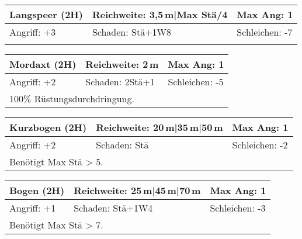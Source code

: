 \documentclass[../../Heldenanleitung2]{subfiles}
\begin{document}
\newline \newline\newline
\begin{tabular}{|p{}|p{}|p{}|}
\hline
\textbf{Langspeer (2H)} & Reichweite: 3,5\,m|Max Stä/4 & Max Ang: 1\\
\hline
Angriff: +3 & Schaden: Stä+1W8 & Schleichen: -7\\
\hline
\multicolumn{3}{|p{0.99\textwidth}|}{} \\
\hline
\end{tabular}
\newline \newline\newline
\begin{tabular}{|p{}|p{}|p{}|}
\hline
\textbf{Mordaxt (2H)} & Reichweite: 2\,m & Max Ang: 1\\
\hline
Angriff: +2 & Schaden: 2Stä+1 & Schleichen: -5\\
\hline
\multicolumn{3}{|p{0.99\textwidth}|}{100\% Rüstungsdurchdringung.} \\
\hline
\end{tabular}
\newline \newline\newline
\begin{tabular}{|p{}|p{}|p{}|}
\hline
\textbf{Kurzbogen (2H)} & Reichweite: 20\,m|35\,m|50\,m & Max Ang: 1 \\
\hline
Angriff: +2 & Schaden: Stä & Schleichen: -2\\
\hline
\multicolumn{3}{|p{0.99\textwidth}|}{Benötigt Max Stä > 5.} \\
\hline
\end{tabular}
\newline \newline\newline
\begin{tabular}{|p{}|p{}|p{}|}
\hline
\textbf{Bogen (2H)} & Reichweite: 25\,m|45\,m|70\,m & Max Ang: 1\\
\hline
Angriff: +1 & Schaden: Stä+1W4 & Schleichen: -3\\
\hline
\multicolumn{3}{|p{0.99\textwidth}|}{Benötigt Max Stä > 7.} \\
\hline
\end{tabular}
\newline \newline\newline
\end{document}
